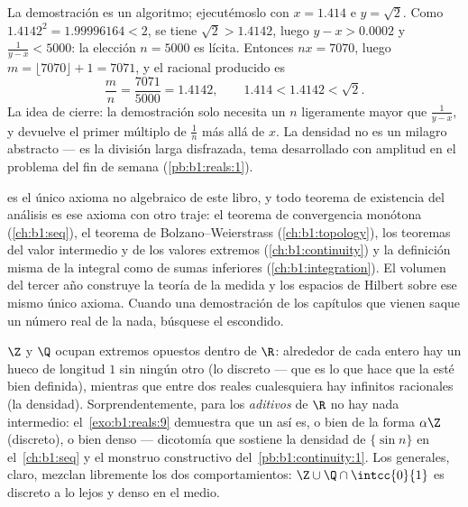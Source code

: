 \begin{example}\label{ex:b1:reals:densityrun}
La demostración es un algoritmo; ejecutémoslo con $x = 1.414$ e
$y = \sqrt 2$. Como $1.4142^2 = 1.99996164 < 2$, se tiene
$\sqrt 2 > 1.4142$, luego $y - x > 0.0002$ y
$\frac{1}{y - x} < 5000$: la elección $n = 5000$ es lícita. Entonces
$nx = 7070$, luego $m = \lfloor 7070 \rfloor + 1 = 7071$, y el racional
producido es
\[
\frac{m}{n} = \frac{7071}{5000} = 1.4142,
\qquad
1.414 < 1.4142 < \sqrt 2 .
\]
La idea de cierre: la demostración solo necesita un $n$ ligeramente
mayor que $\frac{1}{y-x}$, y devuelve el primer múltiplo de $\frac 1n$
más allá de $x$. La densidad no es un milagro abstracto --- es la
división larga disfrazada, tema desarrollado con amplitud en el
problema del fin de semana (\cref{pb:b1:reals:1}).
\end{example}

\begin{remark}
 es el único axioma no algebraico de este
libro, y todo teorema de existencia del análisis es ese axioma con
otro traje: el teorema de convergencia monótona
(\cref{ch:b1:seq}), el teorema de Bolzano--Weierstrass
(\cref{ch:b1:topology}), los teoremas del valor intermedio y de los
valores extremos (\cref{ch:b1:continuity}) y la definición misma de la
integral como  de sumas inferiores
(\cref{ch:b1:integration}). El volumen del tercer año construye la
teoría de la medida y los espacios de Hilbert sobre ese mismo único
axioma. Cuando una demostración de los capítulos que vienen saque un
número real de la nada, búsquese el  escondido.
\end{remark}

\begin{remark}
$\Z$ y $\Q$ ocupan extremos opuestos dentro de $\R$: alrededor de cada
entero hay un hueco de longitud $1$ sin ningún otro (lo discreto ---
que es lo que hace que la  esté bien definida), mientras
que entre dos reales cualesquiera hay infinitos racionales (la
densidad). Sorprendentemente, para los \emph{ aditivos} de
$\R$ no hay nada intermedio: el~\cref{exo:b1:reals:9} demuestra que un
 así es, o bien de la forma $\alpha\Z$ (discreto), o bien
denso --- dicotomía que sostiene la densidad de $\{\sin n\}$ en
el~\cref{ch:b1:seq} y el monstruo constructivo
del~\cref{pb:b1:continuity:1}. Los  generales, claro, mezclan
libremente los dos comportamientos: $\Z \cup \Q\cap\intcc{0}{1}$ es
discreto a lo lejos y denso en el medio.
\end{remark}

